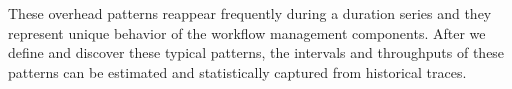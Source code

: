 \documentclass[final]{IEEEtran}
\begin{document}



These overhead patterns reappear frequently during a duration series and they represent unique behavior of the workflow management components. After we define and discover these typical patterns, the intervals and throughputs of these patterns can be estimated and statistically captured from historical traces. 



\end{document}
